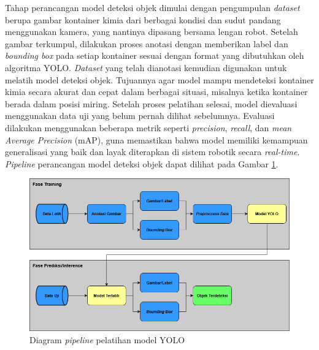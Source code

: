 Tahap perancangan model deteksi objek dimulai dengan pengumpulan
\textit{dataset} berupa gambar kontainer kimia dari berbagai kondisi dan sudut
pandang menggunakan kamera, yang nantinya dipasang bersama lengan
robot. Setelah gambar terkumpul, dilakukan proses anotasi dengan
memberikan label dan \textit{bounding box} pada setiap kontainer sesuai dengan
format yang dibutuhkan oleh algoritma YOLO. \textit{Dataset} yang telah
dianotasi kemudian digunakan untuk melatih model deteksi objek.
Tujuannya agar model mampu mendeteksi kontainer kimia secara akurat
dan cepat dalam berbagai situasi, misalnya ketika kontainer berada
dalam posisi miring. Setelah proses pelatihan selesai, model
dievaluasi menggunakan data uji yang belum pernah dilihat sebelumnya.
Evaluasi dilakukan menggunakan beberapa metrik seperti \textit{precision},
\textit{recall}, dan \textit{mean Average Precision} (mAP), guna
memastikan bahwa model
memiliki kemampuan generalisasi yang baik dan layak diterapkan di
sistem robotik secara \textit{real-time}. \textit{Pipeline}
perancangan model deteksi
objek dapat dilihat pada Gambar \ref{fig:pipeline-yolo}.

\begin{figure}[H]
  \centering
  \includegraphics[width=\textwidth]{gambar/pipeline_yolo.png}
  \caption{Diagram \textit{pipeline} pelatihan model YOLO}
  \label{fig:pipeline-yolo}
\end{figure}
\vspace{-1em}

